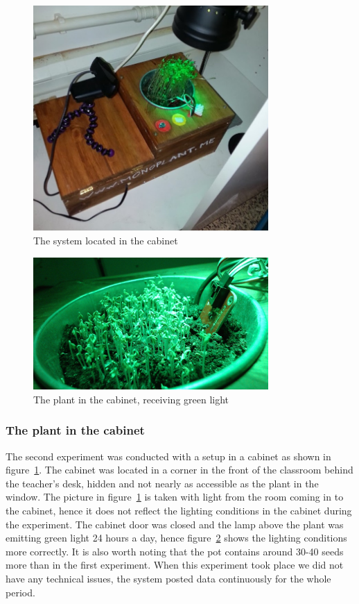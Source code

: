 \begin{figure}
\centering
\includegraphics[width=0.8\textwidth]{img/empiricalsetting/cupboard.jpg}
\caption{The system located in the cabinet}
\label{fig:cabinetplant}
\end{figure}

\begin{figure}
\centering
\includegraphics[width=0.8\textwidth]{img/empiricalsetting/cupboardsystem.jpg}
\caption{The plant in the cabinet, receiving green light}
\label{fig:cabinetsystemplant}
\end{figure}

\subsubsection*{The plant in the cabinet}
The second experiment was conducted with a setup in a cabinet as shown in figure~\ref{fig:cabinetplant}. The cabinet was located in a corner in the front of the classroom behind the teacher's desk, hidden and not nearly as accessible as the plant in the window. The picture in figure~\ref{fig:cabinetplant} is taken with light from the room coming in to the cabinet, hence it does not reflect the lighting conditions in the cabinet during the experiment. The cabinet door was closed and the lamp above the plant was emitting green light 24 hours a day, hence figure~\ref{fig:cabinetsystemplant} shows the lighting conditions more correctly. It is also worth noting that the pot contains around 30-40 seeds more than in the first experiment. When this experiment took place we did not have any technical issues, the system posted data continuously for the whole period.


